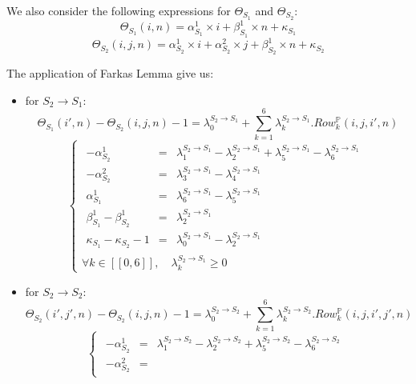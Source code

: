 	We also consider the following expressions for $\Theta_{S_{1}}$ and $\Theta_{S_{2}}$:
$$\Theta_{S_{1}}(i, n) = \alpha_{S_{1}}^{1} \times i + \beta_{S_{1}}^{1} \times n + \kappa_{S_{1}}$$
$$\Theta_{S_{2}}(i, j, n) = \alpha_{S_{2}}^{1} \times i + \alpha_{S_{2}}^{2} \times j + \beta_{S_{2}}^{1} \times n + \kappa_{S_{2}}$$

	The application of Farkas Lemma give us:
\begin{itemize}
	\item for $S_{2} \rightarrow S_{1}$:
	$$ \Theta_{S_{1}}(i', n) - \Theta_{S_{2}}(i, j, n) - 1 =
	\lambda_{0}^{S_{2} \rightarrow S_{1}} + \sum_{k = 1}^{6} \lambda_{k}^{S_{2} \rightarrow S_{1}} . Row_{k}^{\mathbb{P}}(i, j, i', n) $$
	$$ \left\{
	\begin{array}{l}
	\begin{array}{rcl}
			- \alpha_{S_{2}}^{1} & = &
				\lambda_{1}^{S_{2} \rightarrow S_{1}}
				- \lambda_{2}^{S_{2} \rightarrow S_{1}}
				+ \lambda_{5}^{S_{2} \rightarrow S_{1}}
				- \lambda_{6}^{S_{2} \rightarrow S_{1}}\\
			- \alpha_{S_{2}}^{2} & = &
				\lambda_{3}^{S_{2} \rightarrow S_{1}}
				- \lambda_{4}^{S_{2} \rightarrow S_{1}} \\
			\alpha_{S_{1}}^{1} & = &
				\lambda_{6}^{S_{2} \rightarrow S_{1}}
				- \lambda_{5}^{S_{2} \rightarrow S_{1}} \\
			\beta_{S_{1}}^{1} - \beta_{S_{2}}^{1} & = &
				\lambda_{2}^{S_{2} \rightarrow S_{1}} \\
			\kappa_{S_{1}} - \kappa_{S_{2}} - 1 & = &
				\lambda_{0}^{S_{2} \rightarrow S_{1}}
				- \lambda_{2}^{S_{2} \rightarrow S_{1}}
		\end{array}\\
		\forall k \in [\![ 0, 6 ]\!], \quad \lambda_{k}^{S_{2} \rightarrow S_{1}} \geq 0
	\end{array}
	\right. $$
	\item for $S_{2} \rightarrow S_{2}$:
	$$ \Theta_{S_{2}}(i', j', n) - \Theta_{S_{2}}(i, j, n) - 1 =
	\lambda_{0}^{S_{2} \rightarrow S_{2}} + \sum_{k = 1}^{6} \lambda_{k}^{S_{2} \rightarrow S_{2}} . Row_{k}^{\mathbb{P}}(i, j, i', j', n) $$
	$$ \left\{
	\begin{array}{l}
		\begin{array}{rcl}
			 - \alpha_{S_{2}}^{1} & = &
				\lambda_{1}^{S_{2} \rightarrow S_{2}}
				- \lambda_{2}^{S_{2} \rightarrow S_{2}}
				+ \lambda_{5}^{S_{2} \rightarrow S_{2}}
				- \lambda_{6}^{S_{2} \rightarrow S_{2}} \\
			- \alpha_{S_{2}}^{2} & = &

\end{array}
\end{array}$$
\end{itemize}
